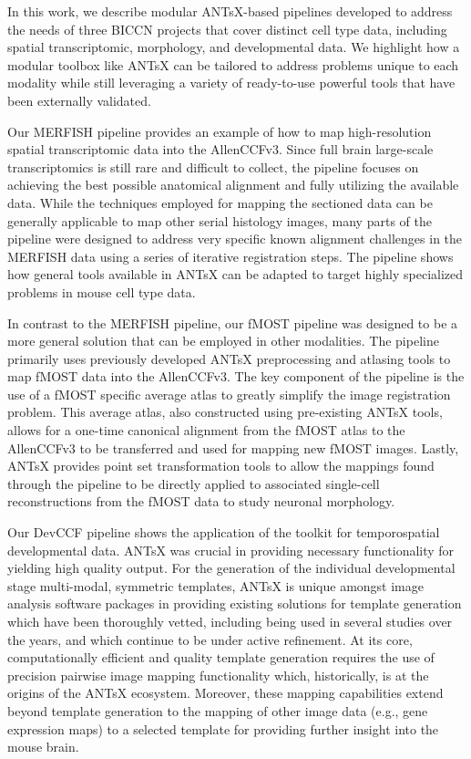 \documentclass[
  12pt,
]{article}
\begin{document}
In this work, we describe modular ANTsX-based pipelines developed to
address the needs of three BICCN projects that cover distinct cell type
data, including spatial transcriptomic, morphology, and developmental
data. We highlight how a modular toolbox like ANTsX can be tailored to
address problems unique to each modality while still leveraging a
variety of ready-to-use powerful tools that have been externally
validated.

Our MERFISH pipeline provides an example of how to map high-resolution
spatial transcriptomic data into the AllenCCFv3. Since full brain
large-scale transcriptomics is still rare and difficult to collect, the
pipeline focuses on achieving the best possible anatomical alignment and
fully utilizing the available data. While the techniques employed for
mapping the sectioned data can be generally applicable to map other
serial histology images, many parts of the pipeline were designed to
address very specific known alignment challenges in the MERFISH data
using a series of iterative registration steps. The pipeline shows how
general tools available in ANTsX can be adapted to target highly
specialized problems in mouse cell type data.

In contrast to the MERFISH pipeline, our fMOST pipeline was designed to
be a more general solution that can be employed in other modalities. The
pipeline primarily uses previously developed ANTsX preprocessing and
atlasing tools to map fMOST data into the AllenCCFv3. The key component
of the pipeline is the use of a fMOST specific average atlas to greatly
simplify the image registration problem. This average atlas, also
constructed using pre-existing ANTsX tools, allows for a one-time
canonical alignment from the fMOST atlas to the AllenCCFv3 to be
transferred and used for mapping new fMOST images. Lastly, ANTsX
provides point set transformation tools to allow the mappings found
through the pipeline to be directly applied to associated single-cell
reconstructions from the fMOST data to study neuronal morphology.

Our DevCCF pipeline shows the application of the toolkit for
temporospatial developmental data. ANTsX was crucial in providing
necessary functionality for yielding high quality output. For the
generation of the individual developmental stage multi-modal, symmetric
templates, ANTsX is unique amongst image analysis software packages in
providing existing solutions for template generation which have been
thoroughly vetted, including being used in several studies over the
years, and which continue to be under active refinement. At its core,
computationally efficient and quality template generation requires the
use of precision pairwise image mapping functionality which,
historically, is at the origins of the ANTsX ecosystem. Moreover, these
mapping capabilities extend beyond template generation to the mapping of
other image data (e.g., gene expression maps) to a selected template for
providing further insight into the mouse brain.
\end{document}

